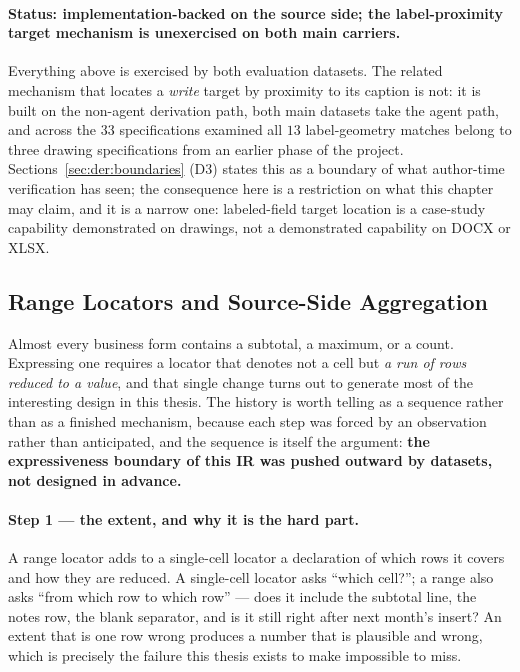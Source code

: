 \paragraph{Status: implementation-backed on the source side; the label-proximity target
mechanism is unexercised on both main carriers.}
Everything above is exercised by both evaluation datasets. The related mechanism that
locates a \emph{write} target by proximity to its caption is not: it is built on the
non-agent derivation path, both main datasets take the agent path, and across the $33$
specifications examined all $13$ label-geometry matches belong to three drawing
specifications from an earlier phase of the project. Sections~\ref{sec:der:boundaries}
(D3) states this as a boundary of what author-time verification has seen; the consequence
here is a restriction on what this chapter may claim, and it is a narrow one: labeled-field
target location is a case-study capability demonstrated on drawings, not a demonstrated
capability on DOCX or XLSX.

\subsection{Range Locators and Source-Side Aggregation}
\label{sec:design:loc:range}

Almost every business form contains a subtotal, a maximum, or a count. Expressing one
requires a locator that denotes not a cell but \emph{a run of rows reduced to a value}, and
that single change turns out to generate most of the interesting design in this thesis. The
history is worth telling as a sequence rather than as a finished mechanism, because each
step was forced by an observation rather than anticipated, and the sequence is itself the
argument: \textbf{the expressiveness boundary of this IR was pushed outward by datasets, not
designed in advance.}

\paragraph{Step 1 --- the extent, and why it is the hard part.}
A range locator adds to a single-cell locator a declaration of which rows it covers and how
they are reduced. A single-cell locator asks ``which cell?''; a range also asks ``from which
row to which row'' --- does it include the subtotal line, the notes row, the blank
separator, and is it still right after next month's insert? An extent that is one row wrong
produces a number that is plausible and wrong, which is precisely the failure this thesis
exists to make impossible to miss.

